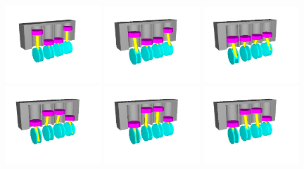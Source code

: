 \begin{figure}[H]
	\centering
	\includegraphics[trim=40 50 90 50,clip,width=0.32\textwidth]{obrazky-figures/Examples/engine/engine t=1.png}
	\includegraphics[trim=40 40 80 40,clip,width=0.32\textwidth]{obrazky-figures/Examples/engine/engine t=2.png}
	\includegraphics[trim=40 40 80 40,clip,width=0.32\textwidth]{obrazky-figures/Examples/engine/engine t=3.png}
	\includegraphics[trim=40 40 80 40,clip,width=0.32\textwidth]{obrazky-figures/Examples/engine/engine t=4.png}
	\includegraphics[trim=40 40 80 40,clip,width=0.32\textwidth]{obrazky-figures/Examples/engine/engine t=5.png}
	\includegraphics[trim=40 40 80 40,clip,width=0.32\textwidth]{obrazky-figures/Examples/engine/engine t=6.png}

\end{figure}
